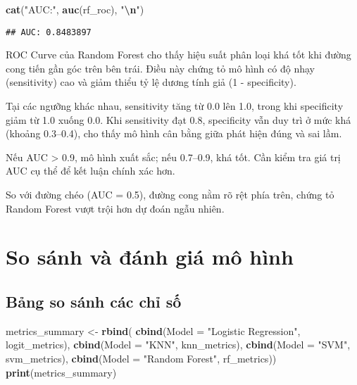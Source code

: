 \documentclass[
]{article}
\newenvironment{Shaded}{\begin{snugshade}}{\end{snugshade}}
\newcommand{\AttributeTok}[1]{\textcolor[rgb]{0.13,0.29,0.53}{#1}}
\newcommand{\FunctionTok}[1]{\textcolor[rgb]{0.13,0.29,0.53}{\textbf{#1}}}
\newcommand{\NormalTok}[1]{#1}
\newcommand{\OtherTok}[1]{\textcolor[rgb]{0.56,0.35,0.01}{#1}}
\newcommand{\SpecialCharTok}[1]{\textcolor[rgb]{0.81,0.36,0.00}{\textbf{#1}}}
\newcommand{\StringTok}[1]{\textcolor[rgb]{0.31,0.60,0.02}{#1}}
\begin{document}
\begin{Shaded}
\begin{Highlighting}[]
\FunctionTok{cat}\NormalTok{(}\StringTok{"AUC:"}\NormalTok{, }\FunctionTok{auc}\NormalTok{(rf\_roc), }\StringTok{"}\SpecialCharTok{\textbackslash{}n}\StringTok{"}\NormalTok{)}
\end{Highlighting}
\end{Shaded}

\begin{verbatim}
## AUC: 0.8483897
\end{verbatim}

ROC Curve của Random Forest cho thấy hiệu suất phân loại khá tốt khi
đường cong tiến gần góc trên bên trái. Điều này chứng tỏ mô hình có độ
nhạy (sensitivity) cao và giảm thiểu tỷ lệ dương tính giả (1 -
specificity).

Tại các ngưỡng khác nhau, sensitivity tăng từ 0.0 lên 1.0, trong khi
specificity giảm từ 1.0 xuống 0.0. Khi sensitivity đạt 0.8, specificity
vẫn duy trì ở mức khá (khoảng 0.3--0.4), cho thấy mô hình cân bằng giữa
phát hiện đúng và sai lầm.

Nếu AUC \textgreater{} 0.9, mô hình xuất sắc; nếu 0.7--0.9, khá tốt. Cần
kiểm tra giá trị AUC cụ thể để kết luận chính xác hơn.

So với đường chéo (AUC = 0.5), đường cong nằm rõ rệt phía trên, chứng tỏ
Random Forest vượt trội hơn dự đoán ngẫu nhiên.

\section{So sánh và đánh giá mô hình}\label{sec-comparison}

\subsection{Bảng so sánh các chỉ số}\label{sec-metrics}

\begin{Shaded}
\begin{Highlighting}[]
\NormalTok{metrics\_summary }\OtherTok{\textless{}{-}} \FunctionTok{rbind}\NormalTok{(}
  \FunctionTok{cbind}\NormalTok{(}\AttributeTok{Model =} \StringTok{"Logistic Regression"}\NormalTok{, logit\_metrics),}
  \FunctionTok{cbind}\NormalTok{(}\AttributeTok{Model =} \StringTok{"KNN"}\NormalTok{, knn\_metrics),}
  \FunctionTok{cbind}\NormalTok{(}\AttributeTok{Model =} \StringTok{"SVM"}\NormalTok{, svm\_metrics),}
  \FunctionTok{cbind}\NormalTok{(}\AttributeTok{Model =} \StringTok{"Random Forest"}\NormalTok{, rf\_metrics))}
\FunctionTok{print}\NormalTok{(metrics\_summary)}
\end{Highlighting}
\end{Shaded}
\end{document}
